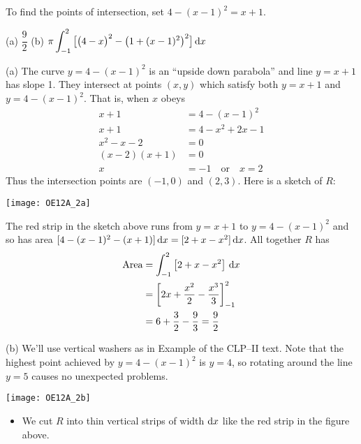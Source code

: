 \begin{hint}
To find the points of intersection, set $4-(x-1)^2=x+1$.
\end{hint}

\begin{answer} (a)
$\dfrac{9}{2}$
\qquad(b)
$
\pi\displaystyle\int_{-1}^2
   \big[{\big(4-x\big)}^2-{\big(1+(x-1)^2\big)}^2\big]\,\mathrm{d}x
$
\end{answer}

\begin{solution} (a)
The curve  $y = 4 - (x - 1)^2$ is an ``upside down parabola''
and line $y = x + 1$ has slope 1. They intersect at points $(x,y)$ which
satisfy both $y=x+1$ and $y=4-(x-1)^2$. That is, when $x$ obeys
\begin{align*}
x+1&=4-(x-1)^2\\
 x+1 &= 4 -x^2+2x-1\\
 x^2-x-2&=0 \\
 (x-2)(x+1)&=0\\
 x&=-1 \quad\mbox{or}\quad x=2
\end{align*}
Thus the intersection points are $(-1,0)$ and $(2,3)$.
Here is a sketch of $R$:

\begin{center}
       \texttt{[image: OE12A\_2a]}
\end{center}

The red strip in the sketch above runs from $y=x+1$  to $y=4-(x-1)^2$
and so has area $[4-(x-1)^2 -(x+1)]\,\mathrm{d}x = [2+x-x^2]\,\mathrm{d}x$.
All together $R$ has
\begin{align*}
\text{Area}
&= \int_{-1}^2 \big[2+x-x^2\big]\ \mathrm{d}x \\
&=\bigg[2x+\frac{x^2}{2}-\frac{x^3}{3}\bigg]_{-1}^2  \\
&=6+\frac{3}{2}-\frac{9}{3}=\frac{9}{2}
\end{align*}

\noindent (b)
We'll use vertical washers as in Example  
of the CLP--II text. Note that the highest point achieved by $y=4-(x-1)^2$ is $y=4$, so rotating around the line $y=5$ causes no unexpected problems.

\begin{center}
       \texttt{[image: OE12A\_2b]}
\end{center}

 \begin{itemize}
\item We cut $R$ into thin vertical strips of width $\mathrm{d}x$ like the red
strip in the figure  above.


\end{itemize}
\end{solution}
